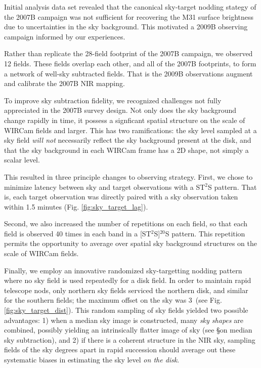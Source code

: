 \documentclass[iop]{emulateapj}
\begin{document}
Initial analysis data set revealed that the canonical sky-target nodding stategy of the 2007B campaign was not sufficient for recovering the M31 surface brightness due to uncertainties in the sky background. This motivated a 2009B observing campaign informed by our experiences.

Rather than replicate the 28-field footprint of the 2007B campaign, we observed 12 fields. These fields overlap each other, and all of the 2007B footprints, to form a network of well-sky subtracted fields. That is the 2009B observations augment and calibrate the 2007B NIR mapping.

To improve sky subtraction fidelity, we recognized challenges not fully appreciated in the 2007B survey design. Not only does the sky background change rapidly in time, it possess a signficant spatial structure on the scale of WIRCam fields and larger. This has two ramifications: the sky level sampled at a sky field \emph{will not} necessarily reflect the sky background present at the disk, and that the sky background in each WIRCam frame has a 2D shape, not simply a scalar level.

This resulted in three principle changes to observing strategy. First, we chose to minimize latency between sky and target observations with a ST$^2$S pattern. That is, each target observation was directly paired with a sky observation taken within 1.5 minutes (Fig. \ref{fig:sky_target_lag}).

Second, we also increased the number of repetitions on each field, so that each field is observed 40 times in each band in a [ST$^2$S]$^{20}$S pattern. This repetition permits the opportunity to average over spatial sky background structures on the scale of WIRCam fields.

Finally, we employ an innovative randomized sky-targetting nodding pattern where no sky field is used repeatedly for a disk field. In order to maintain rapid telescope nods, only northern sky fields serviced the northern disk, and similar for the southern fields; the maximum offset on the sky was 3\arcdeg\ (see Fig. \ref{fig:sky_target_dist}). This random sampling of sky fields yielded two possible advantages: 1) when a median sky image is constructed, many \emph{sky shapes} are combined, possibly yielding an intrinsically flatter image of sky (see \S on median sky subtraction), and 2) if there is a coherent structure in the NIR sky, sampling fields of the sky degrees apart in rapid succession should average out these systematic biases in estimating the sky level \emph{on the disk}.
\end{document}
